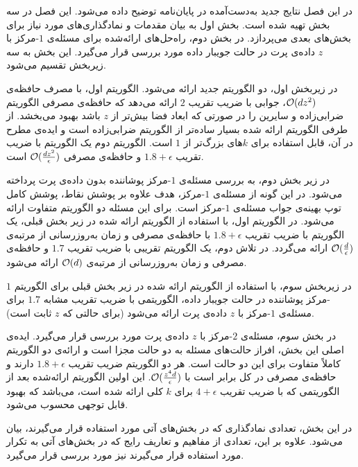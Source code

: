 

در این فصل نتایج جدید به‌دست‌آمده در پایان‌نامه توضیح داده می‌شود.
این فصل در سه بخش تهیه شده است. بخش اول به بیان مقدمات و نمادگذاری‌های مورد نیاز برای بخش‌های بعدی می‌پردازد.
در بخش دوم، راه‌حل‌های ارائه‌شده برای مسئله‌ی $1$-مرکز با $z$ داده‌ی پرت در حالت جویبار داده مورد بررسی قرار می‌گیرد. این بخش به سه زیربخش تقسیم می‌شود. 

در زیربخش اول، دو الگوریتم جدید ارائه می‌شود. الگوریتم اول، با مصرف حافظه‌ی $\mathcal{O}(dz^2)$، جوابی با ضریب تقریب $2$ ارائه می‌دهد که حافظه‌ی مصرفی الگوریتم ضرابی‌زاده و سایرین  را در صورتی که ابعاد فضا بیش‌تر از $z$ باشد بهبود می‌بخشد.
از طرفی الگوریتم ارائه شده بسیار ساده‌تر از الگوریتم ضرابی‌زاده است و ایده‌ی مطرح در آن، قابل استفاده برای $k$های بزرگ‌تر از $1$ است.
الگوریتم دوم یک الگوریتم با ضریب تقریب $1.8 + \epsilon$ و حافظه‌ی مصرفی $\mathcal{O}(\frac{dz^2}{\epsilon})$ است.

در زیر بخش دوم، به بررسی مسئله‌ی $1$-مرکز پوشاننده بدون داده‌ی پرت پرداخته می‌شود.
در این گونه از مسئله‌ی $1$-مرکز، هدف علاوه بر پوشش نقاط، پوشش کامل توپ بهینه‌ی جواب مسئله‌ی $1$-مرکز است.
برای این مسئله دو الگوریتم متفاوت ارائه می‌شود.
در الگوریتم اول، با استفاده از الگوریتم ارائه شده در زیر بخش قبلی، یک الگوریتم با ضریب تقریب $1.8 + \epsilon$ با حافظه‌ی مصرفی و زمان به‌روزرسانی از مرتبه‌ی $\mathcal{O}(\frac{d}{\epsilon})$ ارائه می‌گردد.
در تلاش دوم، یک الگوریتم تقریبی با ضریب تقریب $1.7$ و حافظه‌ی مصرفی و زمان به‌روزرسانی از مرتبه‌ی $\mathcal{O}(d)$ ارائه می‌شود. 

در زیربخش سوم، با استفاده از الگوریتم ارائه شده در زیر بخش قبلی برای الگوریتم $1$-مرکز پوشاننده در حالت جویبار داده، الگوریتمی با ضریب تقریب مشابه $1.7$ برای مسئله‌ی $1$-مرکز با $z$ داده‌ی پرت ارائه می‌شود (برای حالتی که $z$ ثابت است). 

در بخش سوم، مسئله‌ی $2$-مرکز با $z$ داده‌ی پرت مورد بررسی قرار می‌گیرد.
ایده‌ی اصلی این بخش، افراز حالت‌های مسئله به دو حالت مجزا است و ارائه‌ی دو الگوریتم کاملاً متفاوت برای این دو حالت است.
هر دو الگوریتم ضریب تقریب $1.8 + \epsilon$ دارند و حافظه‌ی مصرفی در کل برابر است با 
$\mathcal{O}(\frac{z^4d}{\epsilon})$.
این اولین الگوریتم ارائه‌شده‌ بعد از الگوریتمی که با ضریب تقریب $4+\epsilon$ برای $k$ کلی ارائه شده است، می‌باشد که بهبود قابل توجهی محسوب می‌شود.


در این بخش، تعدادی نمادگذاری که در بخش‌های آتی مورد استفاده قرار می‌گیرند، بیان می‌شود.
علاوه بر این، تعدادی از مفاهیم و تعاریف رایج که در بخش‌های آتی به تکرار مورد استفاده قرار می‌گیرند نیز مورد بررسی قرار می‌گیرد.



